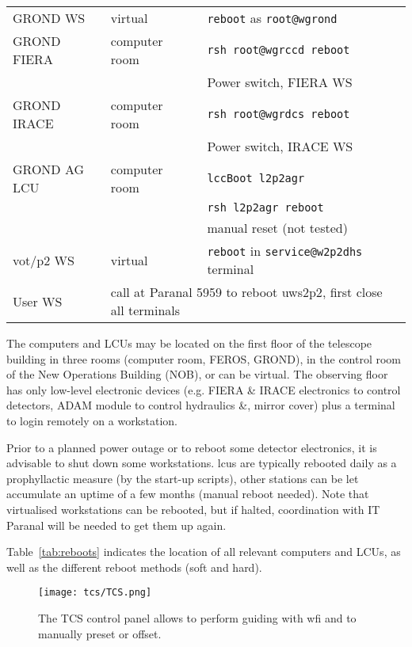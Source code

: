 \documentclass[11pt,fleqn,a4paper]{book}
\begin{document}
\begin{table}[t]
\begin{tabular}{lll}
\hline
GROND WS              & virtual       & \texttt{reboot} as \texttt{root@wgrond}\\
GROND FIERA           & computer room & \texttt{rsh root@\gls{wgrccd} reboot}\\
                      &               & Power switch, FIERA WS\\
GROND IRACE           & computer room & \texttt{rsh root@\gls{wgrdcs} reboot}\\
                      &               & Power switch, IRACE WS\\
GROND AG LCU          & computer room & \texttt{\gls{lccBoot} \gls{l2p2agr}}\\             
                      &               & \texttt{rsh \gls{l2p2agr} reboot}\\
                      &               & manual reset (not tested)\\
\hline
\gls{vot}/\gls{p2} WS & virtual       & \texttt{reboot} in \texttt{service@w2p2dhs} terminal\\
\hline
User WS               & \multicolumn{2}{l}{call at Paranal 5959 to reboot \gls{uws2p2}, first close all terminals}\\
\hline
\end{tabular}
\end{table}
The computers and LCUs may be located on the first floor of the telescope building in three rooms (computer room, FEROS, GROND), in the control room of the New  Operations Building (NOB), or can be virtual.  The observing floor has only low-level electronic devices (e.g. FIERA \& IRACE electronics to control detectors, ADAM module to control hydraulics \&, mirror cover) plus a terminal to login remotely on a workstation.

Prior to a planned power outage or to reboot some detector electronics, it is advisable to shut down some workstations.  \glspl{lcu} are typically rebooted daily as a prophyllactic measure (by the start-up scripts), other stations can be let accumulate an uptime of a few months (manual reboot needed).  Note that virtualised workstations can be rebooted, but if halted, coordination with IT Paranal will be needed to get them up again.

Table~\ref{tab:reboots} indicates the location of all relevant computers and LCUs, as well as the different reboot methods (soft and hard).

\begin{figure}[!ht]
\centering
\texttt{[image: tcs/TCS.png]}
\caption[Main panel of the telescope control software]{The \gls{TCS control panel} allows to perform guiding with \gls{wfi} and to manually preset or offset.}
\label{fig:tcs}
\end{figure}
\end{document}
